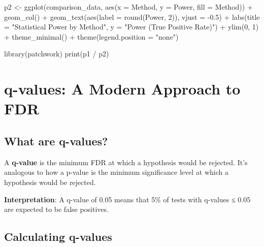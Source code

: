 \documentclass[
  11pt,
  letterpaper,
  oneside]{book}
\newenvironment{Shaded}{\begin{snugshade}}{\end{snugshade}}
\newcommand{\AttributeTok}[1]{\textcolor[rgb]{0.40,0.45,0.13}{#1}}
\newcommand{\DecValTok}[1]{\textcolor[rgb]{0.68,0.00,0.00}{#1}}
\newcommand{\FloatTok}[1]{\textcolor[rgb]{0.68,0.00,0.00}{#1}}
\newcommand{\FunctionTok}[1]{\textcolor[rgb]{0.28,0.35,0.67}{#1}}
\newcommand{\NormalTok}[1]{\textcolor[rgb]{0.00,0.23,0.31}{#1}}
\newcommand{\OtherTok}[1]{\textcolor[rgb]{0.00,0.23,0.31}{#1}}
\newcommand{\SpecialCharTok}[1]{\textcolor[rgb]{0.37,0.37,0.37}{#1}}
\newcommand{\StringTok}[1]{\textcolor[rgb]{0.13,0.47,0.30}{#1}}
\begin{document}
\begin{Shaded}
\begin{Highlighting}[]
\NormalTok{p2 }\OtherTok{\textless{}{-}} \FunctionTok{ggplot}\NormalTok{(comparison\_data, }\FunctionTok{aes}\NormalTok{(}\AttributeTok{x =}\NormalTok{ Method, }\AttributeTok{y =}\NormalTok{ Power, }\AttributeTok{fill =}\NormalTok{ Method)) }\SpecialCharTok{+}
  \FunctionTok{geom\_col}\NormalTok{() }\SpecialCharTok{+}
  \FunctionTok{geom\_text}\NormalTok{(}\FunctionTok{aes}\NormalTok{(}\AttributeTok{label =} \FunctionTok{round}\NormalTok{(Power, }\DecValTok{2}\NormalTok{)), }\AttributeTok{vjust =} \SpecialCharTok{{-}}\FloatTok{0.5}\NormalTok{) }\SpecialCharTok{+}
  \FunctionTok{labs}\NormalTok{(}\AttributeTok{title =} \StringTok{"Statistical Power by Method"}\NormalTok{, }\AttributeTok{y =} \StringTok{"Power (True Positive Rate)"}\NormalTok{) }\SpecialCharTok{+}
  \FunctionTok{ylim}\NormalTok{(}\DecValTok{0}\NormalTok{, }\DecValTok{1}\NormalTok{) }\SpecialCharTok{+}
  \FunctionTok{theme\_minimal}\NormalTok{() }\SpecialCharTok{+}
  \FunctionTok{theme}\NormalTok{(}\AttributeTok{legend.position =} \StringTok{"none"}\NormalTok{)}

\FunctionTok{library}\NormalTok{(patchwork)}
\FunctionTok{print}\NormalTok{(p1 }\SpecialCharTok{/}\NormalTok{ p2)}
\end{Highlighting}
\end{Shaded}

\section{q-values: A Modern Approach to
FDR}\label{q-values-a-modern-approach-to-fdr}

\subsection{What are q-values?}\label{what-are-q-values}

A \textbf{q-value} is the minimum FDR at which a hypothesis would be
rejected. It's analogous to how a p-value is the minimum significance
level at which a hypothesis would be rejected.

\textbf{Interpretation}: A q-value of 0.05 means that 5\% of tests with
q-values ≤ 0.05 are expected to be false positives.

\subsection{Calculating q-values}\label{calculating-q-values}
\end{document}
